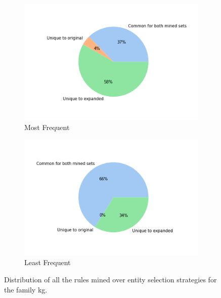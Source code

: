 \begin{figure}[htb]
        \begin{subfigure}[b]{0.49\textwidth}   
            \centering 
            \includegraphics[width=\textwidth]{figures/results/entity_selection/pie_charts/most_frequent_family.png}
            \caption[]%
            {{\small Most Frequent}}    
            \label{fig:most_pie_family}
        \end{subfigure}
        \hfill
        \begin{subfigure}[b]{0.49\textwidth}   
            \centering 
            \includegraphics[width=\textwidth]{figures/results/entity_selection/pie_charts/least_frequent_family.png}
            \caption[]%
            {{\small Least Frequent}}    
            \label{fig:least_pie_family}
        \end{subfigure}
        \caption[]
        {\small Distribution of all the rules mined over entity selection strategies for the family \gls{kg}.} 
        \label{fig:entity_pies_family}
    \end{figure}

